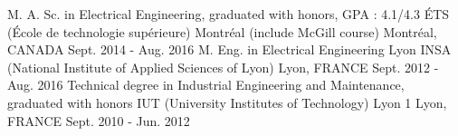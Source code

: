 

\begin{cventries}


\cventry
{M. A. Sc. in Electrical Engineering, graduated with honors, GPA : 4.1/4.3} %
{ÉTS (École de technologie supérieure) Montréal (include McGill course)} %
{Montréal, CANADA} %
{Sept. 2014 - Aug. 2016} %
{ %
}
\vspace{-1.5mm}
\cventry
{M. Eng. in Electrical Engineering} %
{Lyon INSA (National Institute of Applied Sciences of Lyon)} %
{Lyon, FRANCE} %
{Sept. 2012 - Aug. 2016} %
{ %
}
\vspace{-1mm}
\cventry
{Technical degree in Industrial Engineering and Maintenance, graduated with honors} %
{IUT (University Institutes of Technology) Lyon 1} %
{Lyon, FRANCE} %
{Sept. 2010 - Jun. 2012} %
{ %
}
\vspace{-5mm}
\end{cventries}